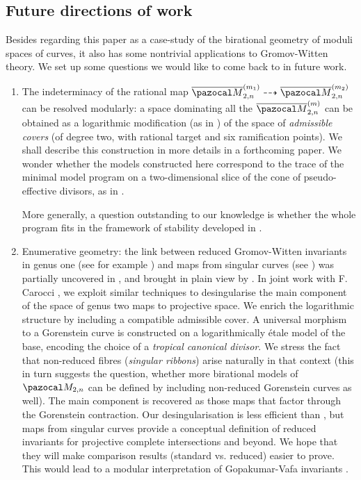 \documentclass{compositio}
\newcommand{\oM}{\overline{\pazocal M}}
\theoremstyle{plain}
\theoremstyle{definition}
\theoremstyle{remark}
\begin{document}
\subsection{Future directions of work} Besides regarding this paper as a case-study of the birational geometry of moduli spaces of curves, it also has some nontrivial applications to Gromov-Witten theory. We set up some questions we would like to come back to in future work.
\begin{enumerate}[leftmargin=.7cm]
 \item The indeterminacy of the rational map $\oM_{2,n}^{(m_1)}\dashrightarrow\oM_{2,n}^{(m_2)}$ can be resolved modularly: a space dominating all the $\oM_{2,n}^{(m)}$ can be obtained as a logarithmic modification (as in \cite{RSPW1}) of the space of \emph{admissible covers} (of degree two, with rational target and six ramification points). We shall describe this construction in more details in a forthcoming paper. We wonder whether the models constructed here correspond to the trace of the minimal model program on a two-dimensional slice of the cone of pseudo-effective divisors, as in \cite{SMY2}.
 
 More generally, a question outstanding to our knowledge is whether the whole program fits in the framework of stability developed in \cite{DHLinstability}.
 
 \item Enumerative geometry: the link between reduced Gromov-Witten invariants in genus one (see for example \cite{VZ,Zingerred,LZ}) and maps from singular curves (see \cite{VISC}) was partially uncovered in \cite{BCM}, and brought in plain view by \cite{RSPW1,RSPW2}. In joint work with F. Carocci \cite{BC}, we exploit similar techniques to desingularise the main component of the space of genus two maps to projective space. We enrich the logarithmic structure by including a compatible admissible cover. A universal morphism to a Gorenstein curve is constructed on a logarithmically \'etale model of the base, encoding the choice of a \emph{tropical canonical divisor}. We stress the fact that non-reduced fibres (\emph{singular ribbons}) arise naturally in that context (this in turn suggests the question, whether more birational models of $\pazocal M_{2,n}$ can be defined by including non-reduced Gorenstein curves as well). The main component is recovered as those maps that factor through the Gorenstein contraction. Our desingularisation is less efficient than \cite{HLN}, but maps from singular curves provide a conceptual definition of reduced invariants for projective complete intersections and beyond. We hope that they will make comparison results (standard vs. reduced) easier to prove. This would lead to a modular interpretation of Gopakumar-Vafa invariants \cite{Pandha}.
\end{enumerate}
\end{document}
